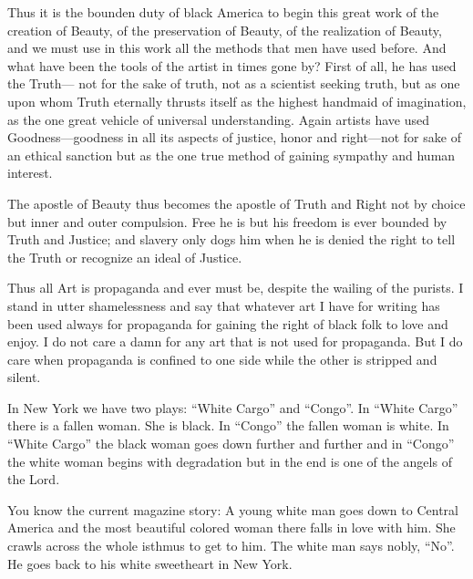 \documentclass[letterpaper,10pt,english]{jupyterBook}
\begin{document}
\sphinxAtStartPar
Thus it is the bounden duty of black America to begin this great work of the creation of Beauty, of the preservation of Beauty, of the realization of Beauty, and we must use in this work all the methods that men have used before. And what have been the tools of the artist in times gone by? First of all, he has used the Truth— not for the sake of truth, not as a scientist seeking truth, but as one upon whom Truth eternally thrusts itself as the highest handmaid of imagination, as the one great vehicle of universal understanding. Again artists have used Goodness—goodness in all its aspects of justice, honor and right—not for sake of an ethical sanction but as the one true method of gaining sympathy and human interest.

\sphinxAtStartPar
The apostle of Beauty thus becomes the apostle of Truth and Right not by choice but inner and outer compulsion. Free he is but his freedom is ever bounded by Truth and Justice; and slavery only dogs him when he is denied the right to tell the Truth or recognize an ideal of Justice.

\sphinxAtStartPar
Thus all Art is propaganda and ever must be, despite the wailing of the purists. I stand in utter shamelessness and say that whatever art I have for writing has been used always for propaganda for gaining the right of black folk to love and enjoy. I do not care a damn for any art that is not used for propaganda. But I do care when propaganda is confined to one side while the other is stripped and silent.

\sphinxAtStartPar
In New York we have two plays: “White Cargo” and “Congo”. In “White Cargo” there is a fallen woman. She is black. In “Congo” the fallen woman is white. In “White Cargo” the black woman goes down further and further and in “Congo” the white woman begins with degradation but in the end is one of the angels of the Lord.

\sphinxAtStartPar
You know the current magazine story: A young white man goes down to Central America and the most beautiful colored woman there falls in love with him. She crawls across the whole isthmus to get to him. The white man says nobly, “No”. He goes back to his white sweetheart in New York.
\end{document}
